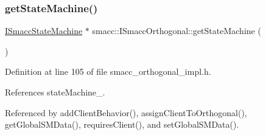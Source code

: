 \subsubsection{\texorpdfstring{get\+State\+Machine()}{getStateMachine()}}
{\footnotesize\ttfamily \hyperlink{classsmacc_1_1ISmaccStateMachine}{I\+Smacc\+State\+Machine} $\ast$ smacc\+::\+I\+Smacc\+Orthogonal\+::get\+State\+Machine (\begin{DoxyParamCaption}{ }\end{DoxyParamCaption})\hspace{0.3cm}{\ttfamily [inline]}}



Definition at line 105 of file smacc\+\_\+orthogonal\+\_\+impl.\+h.



References state\+Machine\+\_\+.



Referenced by add\+Client\+Behavior(), assign\+Client\+To\+Orthogonal(), get\+Global\+S\+M\+Data(), requires\+Client(), and set\+Global\+S\+M\+Data().


